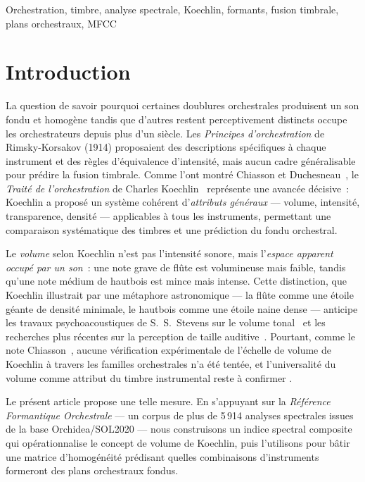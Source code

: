\documentclass[journal]{IEEEtran}
\begin{document}
\begin{IEEEkeywords}
Orchestration, timbre, analyse spectrale, Koechlin, formants, fusion timbrale, plans orchestraux, MFCC
\end{IEEEkeywords}

\section{Introduction}
\label{sec:intro}

La question de savoir pourquoi certaines doublures orchestrales produisent un son fondu et homogène tandis que d'autres restent perceptivement distincts occupe les orchestrateurs depuis plus d'un siècle. Les \textit{Principes d'orchestration} de Rimsky-Korsakov (1914) proposaient des descriptions spécifiques à chaque instrument et des règles d'équivalence d'intensité, mais aucun cadre généralisable pour prédire la fusion timbrale. Comme l'ont montré Chiasson et Duchesneau~\cite{Chiasson2008, DuchesneauChiasson}, le \textit{Traité de l'orchestration} de Charles Koechlin~\cite{Koechlin1954} représente une avancée décisive~: Koechlin a proposé un système cohérent d'\emph{attributs généraux} --- volume, intensité, transparence, densité --- applicables à tous les instruments, permettant une comparaison systématique des timbres et une prédiction du fondu orchestral.

Le \textit{volume} selon Koechlin n'est pas l'intensité sonore, mais l'\emph{espace apparent occupé par un son}~: une note grave de flûte est volumineuse mais faible, tandis qu'une note médium de hautbois est mince mais intense. Cette distinction, que Koechlin illustrait par une métaphore astronomique --- la flûte comme une étoile géante de densité minimale, le hautbois comme une étoile naine dense --- anticipe les travaux psychoacoustiques de S.~S.~Stevens sur le volume tonal~\cite{Stevens1965} et les recherches plus récentes sur la perception de taille auditive~\cite{VanDinther2006}. Pourtant, comme le note Chiasson~\cite{ChiassonHumaniste}, aucune vérification expérimentale de l'échelle de volume de Koechlin à travers les familles orchestrales n'a été tentée, et \og l'universalité du volume comme attribut du timbre instrumental reste à confirmer \fg.

Le présent article propose une telle mesure. En s'appuyant sur la \textit{Référence Formantique Orchestrale} --- un corpus de plus de 5\,914 analyses spectrales issues de la base Orchidea/SOL2020 --- nous construisons un indice spectral composite qui opérationnalise le concept de volume de Koechlin, puis l'utilisons pour bâtir une matrice d'homogénéité prédisant quelles combinaisons d'instruments formeront des plans orchestraux fondus.
\end{document}
